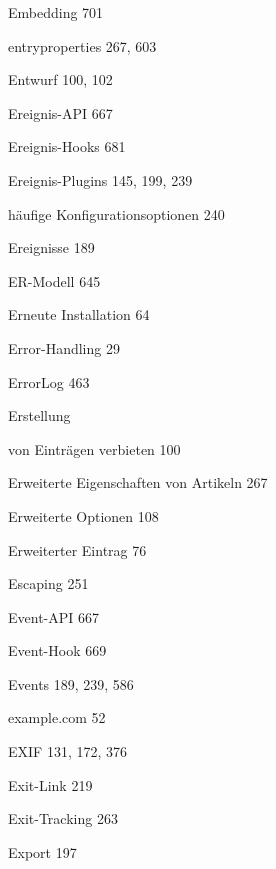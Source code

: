 \documentclass{book}
\renewcommand\subitem{\par}
\begin{document}
\begin{multicols}{2}
\begin{osp-index}
  \item Embedding\hspace{1mm} 701
  \item entryproperties\hspace{1mm} 267, 603
  \item Entwurf\hspace{1mm} 100, 102
  \item Ereignis-API\hspace{1mm} 667
  \item Ereignis-Hooks\hspace{1mm} 681
  \item Ereignis-Plugins\hspace{1mm} 145, 199, 239
    \subitem h\"aufige Konfigurationsoptionen\hspace{1mm} 240
  \item Ereignisse\hspace{1mm} 189
  \item ER-Modell\hspace{1mm} 645
  \item Erneute Installation\hspace{1mm} 64
  \item Error-Handling\hspace{1mm} 29
  \item ErrorLog\hspace{1mm} 463
  \item Erstellung
    \subitem von Eintr\"agen verbieten\hspace{1mm} 100
  \item Erweiterte Eigenschaften von Artikeln\hspace{1mm} 267
  \item Erweiterte Optionen\hspace{1mm} 108
  \item Erweiterter Eintrag\hspace{1mm} 76
  \item Escaping\hspace{1mm} 251
  \item Event-API\hspace{1mm} 667
  \item Event-Hook\hspace{1mm} 669
  \item Events\hspace{1mm} 189, 239, 586
  \item example.com\hspace{1mm} 52
  \item EXIF\hspace{1mm} 131, 172, 376
  \item Exit-Link\hspace{1mm} 219
  \item Exit-Tracking\hspace{1mm} 263
  \item Export\hspace{1mm} 197


\end{osp-index}
\end{multicols}
\end{document}
